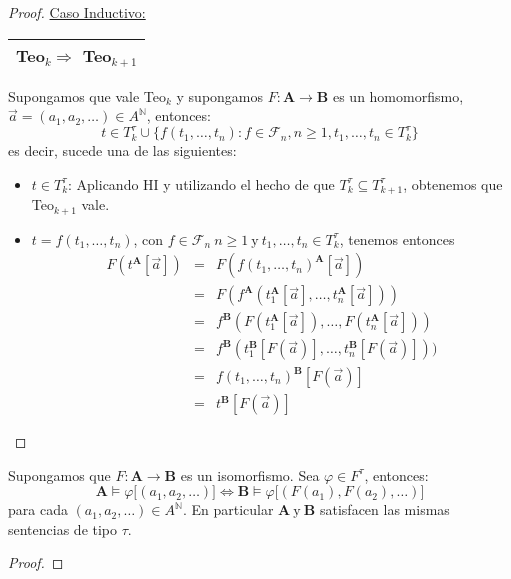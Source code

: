 \begin{proof}
		\PN \underline{Caso Inductivo:} \begin{tabular}{|c|} \hline Teo$_{k} \Rightarrow$ Teo$_{k + 1}$ \\\hline
    \end{tabular} Supongamos que vale Teo$_{k}$ y supongamos $F: \mathbf{A} \rightarrow \mathbf{B}$ es un homomorfismo,
    $\vec{a} = (a_{1}, a_{2}, \dotsc) \in A^{\mathbb{N}}$, entonces:
    \[
      t \in T_{k}^{\tau} \cup \{f(t_{1}, \dotsc, t_{n}): f \in \mathcal{F}_{n},n\geq 1,t_{1}, \dotsc, t_{n} \in
      T_{k}^{\tau}\}
    \]
    \PN es decir, sucede una de las siguientes:
    \begin{itemize}
      \item $t \in T_{k}^{\tau}$: Aplicando HI y utilizando el hecho de que $T_{k}^{\tau} \subseteq T_{k+1}^{\tau}$,
      obtenemos que Teo$_{k+1}$ vale.
      \item $t = f(t_{1}, \dotsc, t_{n})$, con $f \in \mathcal{F}_{n} \ n \geq 1 \ \text{y} \ t_{1}, \dotsc, t_{n} \in
      T_{k}^{\tau}$, tenemos entonces
      \begin{eqnarray*}
        F(t^{\mathbf{A}}[\vec{a}]) &=& F(f(t_{1}, \dotsc, t_{n})^{\mathbf{A}}[\vec{a}]) \\
        &=& F(f^{\mathbf{A}}(t_{1}^{\mathbf{A}}[\vec{a}], \dotsc, t_{n}^{\mathbf{A}}[ \vec{a}])) \\
        &=& f^{\mathbf{B}}(F(t_{1}^{\mathbf{A}}[\vec{a}]), \dotsc, F(t_{n}^{\mathbf{A}}[ \vec{a}])) \\
        &=& f^{\mathbf{B}}(t_{1}^{\mathbf{B}}[F(\vec{a})], \dotsc, t_{n}^{\mathbf{B}}[F( \vec{a})])) \\
        &=& f(t_{1}, \dotsc, t_{n})^{\mathbf{B}}[F(\vec{a})] \\
        &=& t^{\mathbf{B}}[F(\vec{a})]
      \end{eqnarray*}
    \end{itemize}
  \end{proof}

  \begin{lemma} \label{lemma_49}
    \PN Supongamos que $F: \mathbf{A} \rightarrow \mathbf{B}$ es un isomorfismo. Sea $\varphi \in F^{\tau}$, entonces:
    \[
      \mathbf{A} \models \varphi \lbrack (a_{1}, a_{2}, \dotsc)] \Leftrightarrow \mathbf{B} \models \varphi \lbrack
      (F(a_{1}), F(a_{2}), \dotsc)]
    \]
    \PN para cada $(a_{1}, a_{2}, \dotsc) \in A^{\mathbb{N}}$. En particular $\mathbf{A} \ \text{y} \ \mathbf{B}$ satisfacen las
    mismas sentencias de tipo $\tau$.
  \end{lemma}
  \begin{proof}
  \end{proof}

